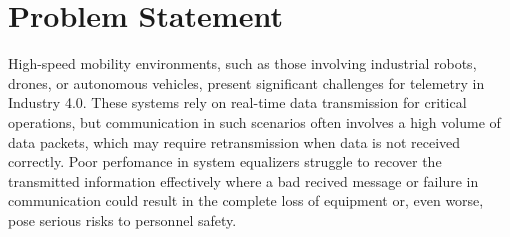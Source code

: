 \section{Problem Statement}

High-speed mobility environments, such as those involving industrial robots, drones, or autonomous vehicles, present significant challenges for telemetry in Industry 4.0. These systems rely on real-time data transmission for critical operations, but communication in such scenarios often involves a high volume of data packets, which may require retransmission when data is not received correctly. Poor perfomance in system equalizers struggle to recover the transmitted information effectively where a bad recived message or failure in communication could result in the complete loss of equipment or, even worse, pose serious risks to personnel safety.
